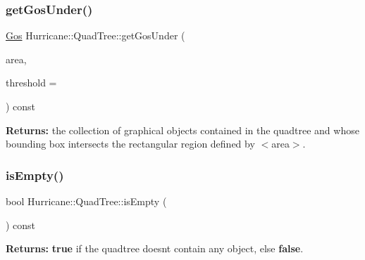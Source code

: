 \mbox{\label{classHurricane_1_1QuadTree_a6b4aa294b89c3f6b5f49388dbb985ff7}} 
\subsubsection{\texorpdfstring{get\+Gos\+Under()}{getGosUnder()}}
{\footnotesize\ttfamily \mbox{\hyperlink{namespaceHurricane_a4456a34f3bc6766d471c3064ace19759}{Gos}} Hurricane\+::\+Quad\+Tree\+::get\+Gos\+Under (\begin{DoxyParamCaption}\item[{const \mbox{\hyperlink{classHurricane_1_1Box}{Box}} \&}]{area,  }\item[{\mbox{\hyperlink{group__DbUGroup_ga4fbfa3e8c89347af76c9628ea06c4146}{Db\+U\+::\+Unit}}}]{threshold = {} }\end{DoxyParamCaption}) const}

{\bfseries Returns\+:} the collection of graphical objects contained in the quadtree and whose bounding box intersects the rectangular region defined by {\ttfamily $<$area$>$}. \mbox{\label{classHurricane_1_1QuadTree_a9d942a3c16a775a9ea576ef7dc753ac9}} 
\subsubsection{\texorpdfstring{is\+Empty()}{isEmpty()}}
{\footnotesize\ttfamily bool Hurricane\+::\+Quad\+Tree\+::is\+Empty (\begin{DoxyParamCaption}{ }\end{DoxyParamCaption}) const\hspace{0.3cm}{\ttfamily [inline]}}

{\bfseries Returns\+:} {\bfseries true} if the quadtree doesn\textquotesingle{}t contain any object, else {\bfseries false}. \mbox{\label{classHurricane_1_1QuadTree_ac39f6a095f3b4148b36b92d2b0906f16}} 
